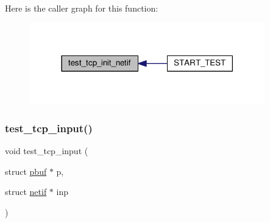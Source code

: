 Here is the caller graph for this function\+:
\nopagebreak
\begin{figure}[H]
\begin{center}
\leavevmode
\includegraphics[width=290pt]{openmote-cc2538_2lwip_2test_2unit_2tcp_2tcp__helper_8h_adce5a273dd4854e4d2b6282265e9fdb7_icgraph}
\end{center}
\end{figure}
\mbox{\label{openmote-cc2538_2lwip_2test_2unit_2tcp_2tcp__helper_8h_a310f0aa8ac7ce26d35fd91c69ff98bda}} 
\subsubsection{\texorpdfstring{test\+\_\+tcp\+\_\+input()}{test\_tcp\_input()}}
{\footnotesize\ttfamily void test\+\_\+tcp\+\_\+input (\begin{DoxyParamCaption}\item[{struct \hyperlink{structpbuf}{pbuf} $\ast$}]{p,  }\item[{struct \hyperlink{structnetif}{netif} $\ast$}]{inp }\end{DoxyParamCaption})}

